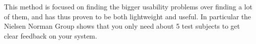 This method is focused on finding the bigger usability problems over finding a lot of them, and has thus proven to be both lightweight and useful. In particular the Nielsen Norman Group\cite{5Users} shows that you only need about 5 test subjects to get clear feedback on your system. 
